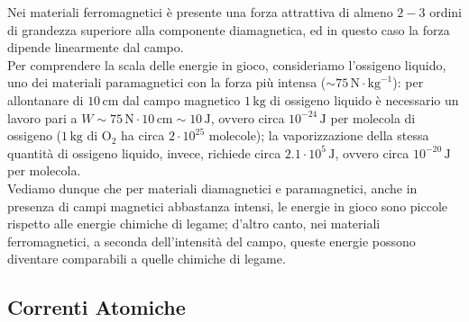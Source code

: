 Nei materiali ferromagnetici è presente una forza attrattiva di almeno $ 2-3 $ ordini di grandezza superiore alla componente diamagnetica, ed in questo caso la forza dipende linearmente dal campo. \\ 
%
Per comprendere la scala delle energie in gioco, consideriamo l'ossigeno liquido, uno dei materiali paramagnetici con la forza più intensa ($ \sim 75\,\text{N}\cdot\text{kg}^{-1} $): per allontanare di $ 10\,\text{cm} $ dal campo magnetico $ 1\,\text{kg} $ di ossigeno liquido è necessario un lavoro pari a $ W \sim 75 \,\text{N} \cdot 10\,\text{cm} \sim 10\,\text{J} $, ovvero circa $ 10^{-24}\,\text{J} $ per molecola di ossigeno ($ 1\,\text{kg} $ di $ \text{O}_2 $ ha circa $ 2\cdot 10^{25} $ molecole); la vaporizzazione della stessa quantità di ossigeno liquido, invece, richiede circa $ 2.1\cdot 10^5 \,\text{J} $, ovvero circa $ 10^{-20}\,\text{J} $ per molecola. \\ 
Vediamo dunque che per materiali diamagnetici e paramagnetici, anche in presenza di campi magnetici abbastanza intensi, le energie in gioco sono piccole rispetto alle energie chimiche di legame; d'altro canto, nei materiali ferromagnetici, a seconda dell'intensità del campo, queste energie possono diventare comparabili a quelle chimiche di legame.

\subsection{Correnti Atomiche}

